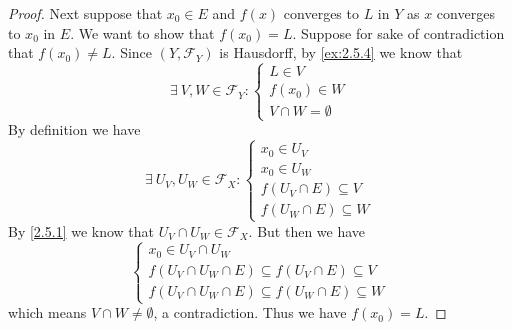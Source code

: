 \begin{proof}
  Next suppose that \(x_0 \in E\) and \(f(x)\) converges to \(L\) in \(Y\) as \(x\) converges to \(x_0\) in \(E\).
  We want to show that \(f(x_0) = L\).
  Suppose for sake of contradiction that \(f(x_0) \neq L\).
  Since \((Y, \mathcal{F}_Y)\) is Hausdorff, by \cref{ex:2.5.4} we know that
  \[
    \exists\ V, W \in \mathcal{F}_Y : \begin{cases}
      L \in V      \\
      f(x_0) \in W \\
      V \cap W = \emptyset
    \end{cases}
  \]
  By definition we have
  \[
    \exists\ U_V, U_W \in \mathcal{F}_X : \begin{cases}
      x_0 \in U_V               \\
      x_0 \in U_W               \\
      f(U_V \cap E) \subseteq V \\
      f(U_W \cap E) \subseteq W
    \end{cases}
  \]
  By \cref{2.5.1} we know that \(U_V \cap U_W \in \mathcal{F}_X\).
  But then we have
  \[
    \begin{cases}
      x_0 \in U_V \cap U_W                                       \\
      f(U_V \cap U_W \cap E) \subseteq f(U_V \cap E) \subseteq V \\
      f(U_V \cap U_W \cap E) \subseteq f(U_W \cap E) \subseteq W
    \end{cases}
  \]
  which means \(V \cap W \neq \emptyset\), a contradiction.
  Thus we have \(f(x_0) = L\).


\end{proof}
